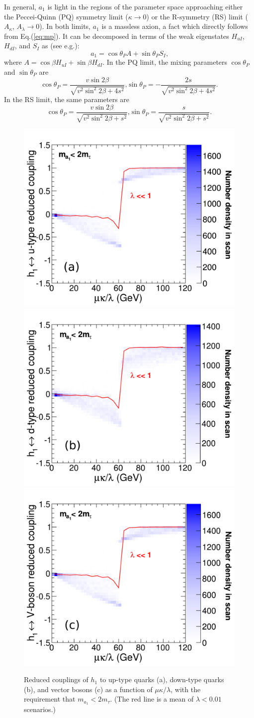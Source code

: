 \documentclass[aps,prl,twocolumn,nofootinbib,superscriptaddress]{revtex4}
\begin{document}
In general, $a_1$ is light in the regions of the parameter space
approaching either the Peccei-Quinn (PQ) symmetry limit ($\kappa \to
0$) or the R-symmetry (RS) limit ($A_\kappa$, $A_\lambda \to 0$).  In
both limits, $a_1$ is a massless axion, a fact which directly follows
from Eq.(\ref{eq:mp}).  It can be decomposed in terms of the weak
eigenstates $H_{uI}$, $H_{dI}$, and $S_I$ as (see
e.g.\cite{Ellwanger:2009dp}):
\begin{equation}
a_1 = \cos\theta_P A + \sin\theta_P S_I\mbox{,}
\end{equation}
where $A = \cos\beta H_{uI} + \sin\beta H_{dI}$.  In the PQ limit,
the mixing parameters $\cos\theta_P$ and $\sin\theta_P$ are
\begin{equation}
\cos \theta_P = \frac{v \sin 2\beta}{\sqrt{v^2\sin^2 2\beta + 4 s^2}}\mbox{,}
\sin \theta_P = -\frac{2s}{\sqrt{v^2\sin^2 2\beta + 4 s^2}}\mbox{.}
\label{eq:pqmix}
\end{equation}
In the RS limit, the same parameters are
\begin{equation}
\cos \theta_P = \frac{v \sin 2\beta}{\sqrt{v^2\sin^2 2\beta + s^2}}\mbox{,}
\sin \theta_P = \frac{s}{\sqrt{v^2\sin^2 2\beta + s^2}}\mbox{.}
\label{eq:rsmix}
\end{equation}

\begin{figure}[thb]
\includegraphics[width=0.32\linewidth]{plots/cu1_vs_mkoverl}
\hfill
\includegraphics[width=0.32\linewidth]{plots/cd1_vs_mkoverl}
\hfill
\includegraphics[width=0.32\linewidth]{plots/cv1_vs_mkoverl}

\caption{Reduced couplings of $h_1$ to up-type quarks (a), down-type
  quarks (b), and vector bosons (c) as a function of $\mu\kappa/\lambda$, with
  the requirement that $m_{a_1} < 2m_\tau$.  (The red line is a mean
  of $\lambda < 0.01$ scenarios.) \label{fig:sm_mukoverl1}}
\end{figure}
\end{document}
